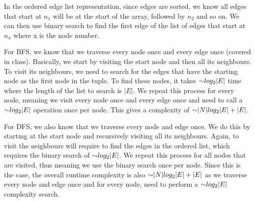 \begin{problem}
\begin{questions}
In the ordered edge list representation, since edges are sorted, we know all edges that start at $n_1$ will be at the start of the array, followed by $n_2$ and so on. We can then use binary search to find the first edge of the list of edges that start at $n_x$ where x is the node number. 

For BFS, we know that we traverse every node once and every edge once (covered in class). Basically, we start by visiting the start node and then all its neighbours. To visit its neighbours, we need to search for the edges that have the starting node as the first node in the tuple. To find these nodes, it takes $\mathord{\sim}log_2{|E|}$ time where the length of the list to search is $|E|$. We repeat this process for every node, meaning we visit every node once and every edge once and need to call a $\mathord{\sim}log_2{|E|}$ operation once per node. This gives a complexity of $\mathord{\sim}|N|log_2|E| + |E|$.

For DFS, we also know that we traverse every node and edge once. We do this by starting at the start node and recursively visiting all its neighbours. Again, to visit the neighbours will require to find the edges in the ordered list, which requires the binary search of $\mathord{\sim}log_2{|E|}$. We repeat this process for all nodes that are visited, thus meaning we use the binary search once per node. Since this is the case, the overall runtime complexity is also $\mathord{\sim}|N|log_2|E| + |E|$ as we traverse every node and edge once and for every node, need to perform a $\mathord{\sim}log_2{|E|}$ complexity search.

\end{questions}
\end{problem}

